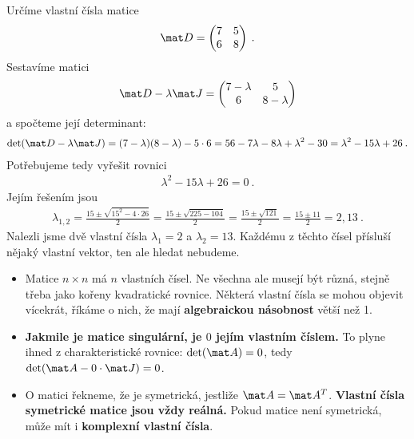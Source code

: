 \begin{example}
    Určíme vlastní čísla matice \begin{align}
        \mat D = \begin{pmatrix}
            7 & 5 \\ 6 & 8
        \end{pmatrix} \:.
    \end{align}
    Sestavíme matici
    \begin{align}
        \mat D - \lambda \mat J = \begin{pmatrix}
            7-\lambda & 5 \\ 6 & 8-\lambda
        \end{pmatrix}
    \end{align}
    a spočteme její determinant:
    \begin{align}
        \det (\mat D - \lambda \mat J) = (7-\lambda)(8-\lambda) - 5 \cdot 6 = 56 - 7\lambda - 8 \lambda + \lambda^2 - 30 = \lambda^2 - 15 \lambda + 26 \:.
    \end{align}
    Potřebujeme tedy vyřešit rovnici
    \begin{align}
        \lambda^2 - 15 \lambda + 26 = 0 \:.
    \end{align}
    Jejím řešením jsou
    \begin{align}
        \lambda_{1,2} =  \frac{15 \pm \sqrt{15^2-4\cdot 26}}{2} = \frac{15 \pm \sqrt{225-104}}{2} = \frac{15 \pm \sqrt{121}}{2} = \frac{15 \pm 11}{2} = 2, 13 \:.
    \end{align}
    Nalezli jsme dvě vlastní čísla $\lambda_1 = 2$ a $\lambda_2 = 13$. Každému z těchto čísel přísluší nějaký vlastní vektor, ten ale hledat nebudeme.
\end{example}

\begin{itemize}
    \item Matice $n \times n$ má $n$ vlastních čísel. Ne všechna ale musejí být různá, stejně třeba jako kořeny kvadratické rovnice. Některá vlastní čísla se mohou objevit vícekrát, říkáme o nich, že mají \textbf{algebraickou násobnost} větší než 1.
    \item \textbf{Jakmile je matice singulární, je $0$ jejím vlastním číslem.} To plyne ihned z charakteristické rovnice: $\det (\mat A ) = 0$, tedy $\det (\mat A - 0 \cdot \mat J) = 0$.
    \item O matici řekneme, že je symetrická, jestliže $\mat A = \mat A^T$. \textbf{Vlastní čísla symetrické matice jsou vždy reálná.} Pokud matice není symetrická, může mít i \textbf{komplexní vlastní čísla}.
\end{itemize}

